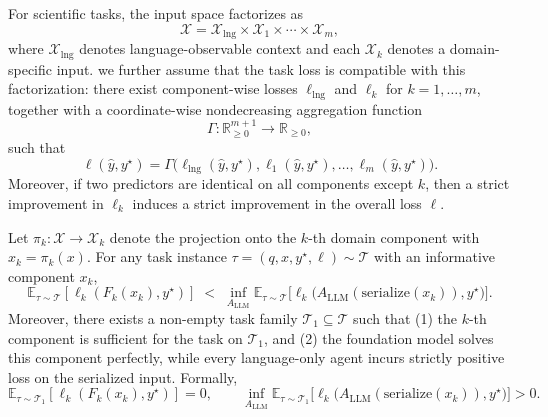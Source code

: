 \begin{assumption}
\label{assumption:task_factorization}
For scientific tasks, the input space factorizes as
\begin{equation}
    \mathcal{X} = \mathcal{X}_{\mathrm{lng}} \times \mathcal{X}_{1} \times \cdots \times \mathcal{X}_{m},
\end{equation}
where $\mathcal{X}_{\mathrm{lng}}$ denotes language-observable context and each $\mathcal{X}_k$ denotes a domain-specific input.
we further assume that the task loss is compatible with this factorization: there exist component-wise losses $\ell_{\mathrm{lng}}$ and $\ell_k$ for $k=1,\dots,m$, together with a coordinate-wise nondecreasing aggregation function
\begin{equation}
\Gamma:\mathbb{R}_{\ge 0}^{m+1}\to\mathbb{R}_{\ge 0},
\end{equation}
such that
\begin{equation}
    \ell(\hat y,y^\star)
    =
    \Gamma\!\big(\ell_{\mathrm{lng}}(\hat y,y^\star), \ell_1(\hat y,y^\star), \dots, \ell_m(\hat y,y^\star)\big).
\end{equation}
Moreover, if two predictors are identical on all components except $k$, then a strict improvement in $\ell_k$ induces a strict improvement in the overall loss $\ell$.
\end{assumption}

\begin{assumption}
\label{assumption:domain_advantage_app}
Let $\pi_k:\mathcal{X}\to\mathcal{X}_k$ denote the projection onto the $k$-th domain component with $x_k=\pi_k(x)$. For any task instance $\tau=(q,x,y^\star,\ell)\sim\mathcal{T}$ with an informative component $x_k$,
\begin{equation}
\mathbb{E}_{\tau\sim\mathcal{T}}[\ell_k(F_k(x_k),y^\star)]
\;<\;
\inf_{A_{\mathrm{LLM}}}\mathbb{E}_{\tau\sim\mathcal{T}}\big[\ell_k\big(A_{\mathrm{LLM}}(\mathrm{serialize}(x_k)),y^\star\big)\big].
\end{equation}
Moreover, there exists a non-empty task family $\mathcal{T}_1\subseteq\mathcal{T}$ such that (1) the $k$-th component is sufficient for the task on $\mathcal{T}_1$, and (2) the foundation model solves this component perfectly, while every language-only agent incurs strictly positive loss on the serialized input. Formally,
\begin{equation}
\mathbb{E}_{\tau\sim\mathcal{T}_1}[\ell_k(F_k(x_k),y^\star)] = 0,
\qquad
\inf_{A_{\mathrm{LLM}}}
\mathbb{E}_{\tau\sim\mathcal{T}_1}
\big[\ell_k\big(A_{\mathrm{LLM}}(\mathrm{serialize}(x_k)),y^\star\big)\big] > 0.
\end{equation}
\end{assumption}

